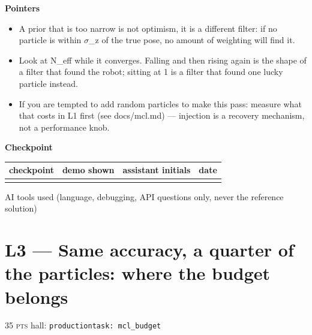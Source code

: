 \documentclass[a4paper,10pt]{article}
\newcommand{\pts}[1]{\textsc{#1 pts}}
\begin{document}
\vspace{4pt}\noindent\textbf{Pointers}

\begin{itemize}\itemsep1pt

\item A prior that is too narrow is not optimism, it is a different filter: if no particle is within \(\sigma\)\_z of the true pose, no amount of weighting will find it.

\item Look at N\_eff while it converges. Falling and then rising again is the shape of a filter that found the robot; sitting at 1 is a filter that found one lucky particle instead.

\item If you are tempted to add random particles to make this pass: measure what that costs in L1 first (see docs/mcl.md) --- injection is a recovery mechanism, not a performance knob.

\end{itemize}

\vspace{4pt}\noindent\textbf{Checkpoint}

\begin{tabular}{|>{\raggedright\hyphenpenalty 500\arraybackslash}p{4.87cm}|>{\raggedright\hyphenpenalty 500\arraybackslash}p{2.80cm}|>{\raggedright\hyphenpenalty 500\arraybackslash}p{4.48cm}|>{\raggedright\hyphenpenalty 500\arraybackslash}p{2.34cm}|}
\hline
\textbf{checkpoint} & \textbf{demo shown} & \textbf{assistant initials} & \textbf{date} \\
\hline
\rule{0pt}{2.4em} & \rule{0pt}{2.4em} & \rule{0pt}{2.4em} & \rule{0pt}{2.4em} \\
\hline
\end{tabular}

\vspace{2pt}\noindent AI tools used (language, debugging, API questions only, never the reference solution)\hrulefill

\newpage

\section{L3 --- Same accuracy, a quarter of the particles: where the budget belongs}

\noindent\hfill\pts{35}\hspace{1em} hall: \texttt{production}\hspace{1em}\texttt{task: mcl\_budget}
\end{document}
